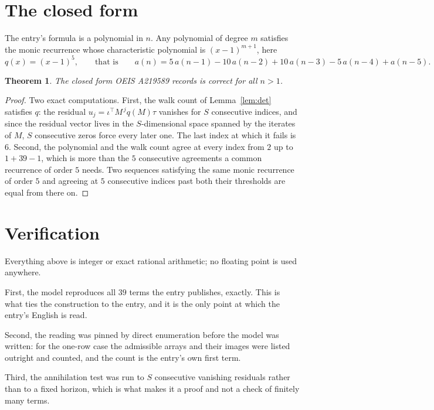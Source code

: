 \documentclass[11pt,a4paper]{article}
\theoremstyle{plain}
\newtheorem{theorem}{Theorem}
\theoremstyle{definition}
\begin{document}
\section{The closed form}

The entry's formula is a polynomial in $n$. Any polynomial of degree $m$ satisfies the monic
recurrence whose characteristic polynomial is $(x-1)^{m+1}$, here
\[
q(x)=(x-1)^{5},\qquad\text{that is}\qquad a(n)=5\,a(n-1) - 10\,a(n-2) + 10\,a(n-3) - 5\,a(n-4) + a(n-5).
\]

\begin{theorem}
The closed form OEIS A219589 records is correct for all $n>1$.
\end{theorem}

\begin{proof}
Two exact computations. First, the walk count of Lemma~\ref{lem:det} satisfies $q$: the
residual $u_j=\iota^{\!\top}M^{\,j}q(M)\tau$ vanishes for $S$ consecutive indices, and
since the residual vector lives in the $S$-dimensional space spanned by the iterates of $M$,
$S$ consecutive zeros force every later one. The last index at which it fails is $6$.
Second, the polynomial and the walk count agree at every index from $2$ up to
$1 + 39 - 1$, which is more than the $5$ consecutive agreements a
common recurrence of order $5$ needs. Two sequences satisfying the same monic recurrence
of order $5$ and agreeing at $5$ consecutive indices past both their thresholds are
equal from there on.
\end{proof}

\section{Verification}

Everything above is integer or exact rational arithmetic; no floating point is used anywhere.

First, the model reproduces all $39$ terms the entry publishes, exactly. This is what
ties the construction to the entry, and it is the only point at which the entry's English is
read.

Second, the reading was pinned by direct enumeration before the model was written: for the
one-row case the admissible arrays and their images were listed outright and counted, and the
count is the entry's own first term.

Third, the annihilation test was run to $S$ consecutive vanishing residuals rather than to a
fixed horizon, which is what makes it a proof and not a check of finitely many terms.
\end{document}
